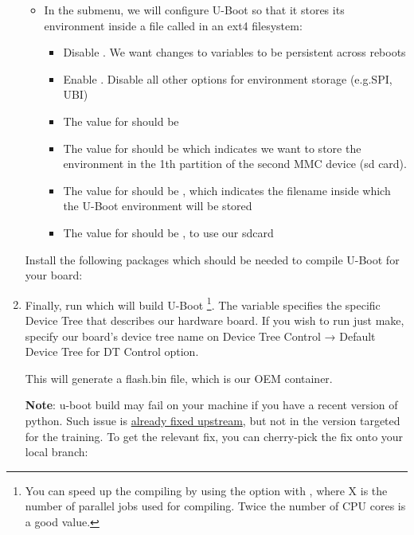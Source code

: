 \begin{enumerate}
  \begin{itemize}

  \item In the  submenu, we will configure U-Boot so
    that it stores its environment inside a file called 
    in an ext4 filesystem:
    \begin{itemize}
    \item Disable . We want changes to variables to
        be persistent across reboots
    \item Enable . Disable all other
        options for environment storage (e.g.SPI, UBI)
    \item The value for  should be 
    \item The value for  should be  which indicates
      we want to store the environment in the 1th partition of the
      second MMC device (sd card).
    \item The value for  should be , which indicates the
      filename inside which the U-Boot environment will be stored
    \item The value for  should be , to use our sdcard
    \end{itemize}
  \end{itemize}

Install the following packages which should be needed to compile U-Boot for
your board:


\item Finally, run 
  which will build U-Boot
  \footnote{You can speed up the
  compiling by using the  option with , where X
  is the number of parallel jobs used for compiling. Twice the
  number of CPU cores is a good value.}.
  The  variable specifies the specific
  Device Tree that describes our hardware board. If you wish to
run just make, specify our board’s device tree name on Device Tree Control → Default Device Tree
for DT Control option.

This will generate a flash.bin file, which is our OEM container.

{\bf Note}: u-boot build may fail on your machine if you have a recent
version of python. Such issue is
\href{https://source.denx.de/u-boot/u-boot/-/commit/a63456b9191fae2fe49f4b121e025792022e3950}{already
fixed upstream}, but not in the version targeted for the training. To get the
relevant fix,
you can cherry-pick the fix onto your local branch:

\end{enumerate}


